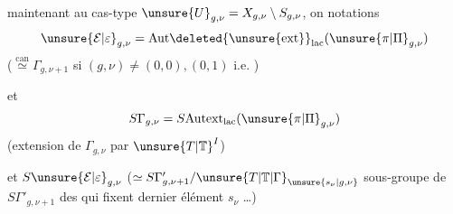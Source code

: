  maintenant au cas-type 
$\unsure{U}_{g,\nu}=X_{g,\nu}\setminus S_{g,\nu}$, on   notations
\[
\unsure{\mathcal E|\varepsilon}_{g,\nu}
=\mathrm{Aut}\deleted{\unsure{\mathrm{ext}}}_{\mathrm{lac}}
(\unsure{\pi|\Pi}_{g,\nu})
\]
($\stackrel{\mathrm{can}}{\simeq}\Gamma_{g,\nu+1}$ si $(g,\nu)\ne(0,0),(0,1)$ i.e. ) 

et
\[
S\Gamma_{g,\nu}=S\mathrm{Autext}_{\mathrm{lac}}(\unsure{\pi|\Pi}_{g,\nu})
\]
(extension de $\Gamma_{g,\nu}$ par $\unsure{T|\mathbb T}^I$)

et $S\unsure{\mathcal E|\varepsilon}_{g,\nu}$
($\simeq S\Gamma'_{g,\nu+1}/\unsure{T|\mathbb T|\Gamma}_{\unsure{s_\nu|g,\nu}}$
sous-groupe de $S\Gamma'_{g,\nu+1}$ des  qui fixent  dernier élément $s_\nu$ \ldots)

